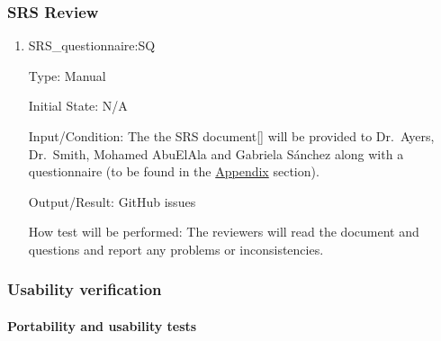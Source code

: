 \documentclass[12pt, titlepage]{article}
\begin{document}
\subsubsection{SRS Review}
\label{section:srsreview}
		

\begin{enumerate}

\item{SRS\_questionnaire:SQ}

Type: Manual
					
Initial State: N/A
					
Input/Condition: 
The the SRS document[\cite{SRS2020}] will be provided to Dr.\ Ayers, Dr.\ Smith, 
Mohamed AbuElAla and Gabriela S\'anchez along with a questionnaire (to be found 
in the \hyperref[section:appendix]{Appendix} section).
					
Output/Result: GitHub issues 
					
How test will be performed: 
The reviewers will read the document and questions and  report any problems or 
inconsistencies.

\end{enumerate}

\subsubsection{Usability verification}
\label{section:usability}

\paragraph{Portability and usability tests}
\end{document}
